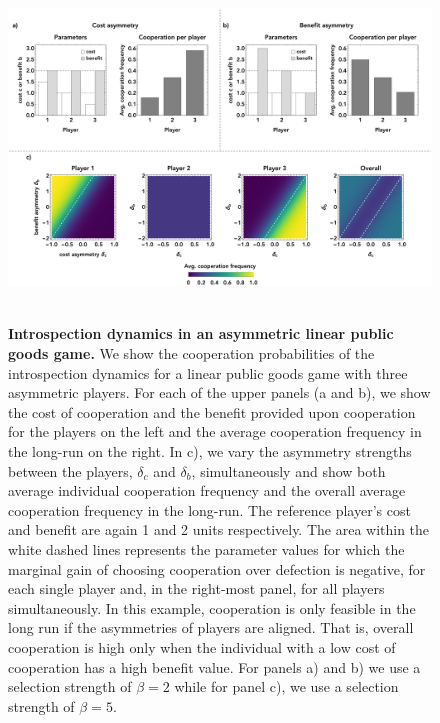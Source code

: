 \documentclass[11pt]{article}
\theoremstyle{plainCl1}
\theoremstyle{plainCl2}
\begin{document}
\clearpage
\begin{figure}
\centering
\includegraphics[width =  \textwidth]{figures/figure2.eps}~\\[0.4cm]
\caption{\onehalfspacing
\textbf{Introspection dynamics in an asymmetric linear public goods game.} We show the cooperation probabilities of the introspection dynamics for a linear public goods game with three asymmetric players. For each of the upper panels (a and b), we show the cost of cooperation and the benefit provided upon cooperation for the players on the left and the average cooperation frequency in the long-run on the right. %
In c), we vary the asymmetry strengths between the players, $\delta_c $ and $\delta_b$, simultaneously and show both average individual cooperation frequency and the overall average cooperation frequency in the long-run. The reference player's cost and benefit are again 1 and 2 units respectively. The area within the white dashed lines represents the parameter values for which the marginal gain of choosing cooperation over defection is negative, for each single player and, in the right-most panel, for all players simultaneously. In this example, cooperation is only feasible in the long run if the asymmetries of players are aligned. That is, overall cooperation is high only when the individual with a low cost of cooperation has a high benefit value. For panels a) and b) we use a selection strength of $\beta = 2$ while for panel c), we use a selection strength of $\beta = 5$. 
}
\label{Fig:LPGG-asymmetric}
\end{figure}
\end{document}
